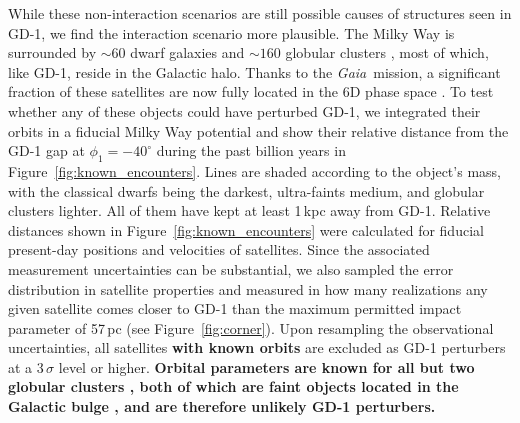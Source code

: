 \documentclass[twocolumn]{aastex62}
\newcommand{\gaia}{\textsl{Gaia}}
\newcommand{\changes}[1]{{\textbf{#1}}}
\begin{document}
While these non-interaction scenarios are still possible causes of structures seen in GD-1, we find the interaction scenario more plausible.
The Milky Way is surrounded by $\sim60$ dwarf galaxies \citep{mcconnachie2012} and $\sim160$ globular clusters \citep{harris2010}, most of which, like GD-1, reside in the Galactic halo.
Thanks to the \gaia\ mission, a significant fraction of these satellites are now fully located in the 6D phase space \citep{simon2018, gdr2_satellites, baumgardt2019}.
To test whether any of these objects could have perturbed GD-1, we integrated their orbits in a fiducial Milky Way potential \citep{pw2017} and show their relative distance from the GD-1 gap at $\phi_1=-40^\circ$ during the past billion years in Figure~\ref{fig:known_encounters}.
Lines are shaded according to the object's mass, with the classical dwarfs being the darkest, ultra-faints medium, and globular clusters lighter.
All of them have kept at least 1\,kpc away from GD-1.
Relative distances shown in Figure~\ref{fig:known_encounters} were calculated for fiducial present-day positions and velocities of satellites.
Since the associated measurement uncertainties can be substantial, we also sampled the error distribution in satellite properties and measured in how many realizations any given satellite comes closer to GD-1 than the maximum permitted impact parameter of 57\,pc (see Figure~\ref{fig:corner}).
Upon resampling the observational uncertainties, all satellites \changes{with known orbits} are excluded as GD-1 perturbers at a $3\,\sigma$ level or higher. 
\changes{Orbital parameters are known for all but two globular clusters \citep[GLIMPSE C02 and 2MASS-GC01,][]{baumgardt2019}, both of which are faint objects located in the Galactic bulge \citep{kurtev2008, bonatto2008}, and are therefore unlikely GD-1 perturbers.}
\end{document}
